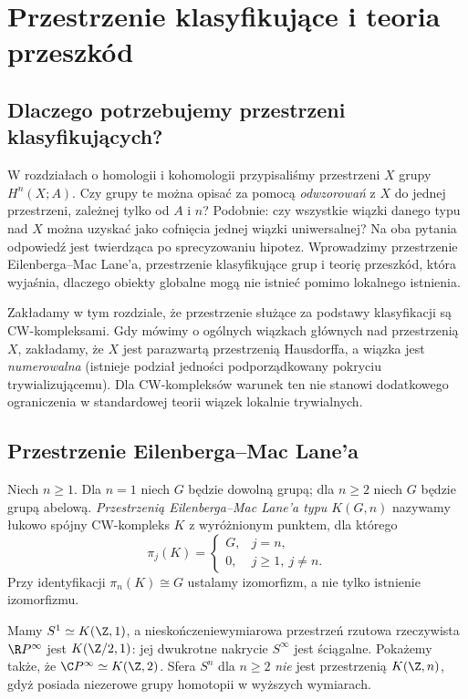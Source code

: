 \chapter{Przestrzenie klasyfikujące i teoria przeszkód}
\label{ch:klasyfikacja-v6}

\providecommand{\atlasref}[2]{#2}


\section{Dlaczego potrzebujemy przestrzeni klasyfikujących?}
W rozdziałach o homologii i kohomologii przypisaliśmy przestrzeni $X$
grupy $H^n(X;A)$. Czy grupy te można opisać za pomocą
\emph{odwzorowań} z $X$ do jednej przestrzeni, zależnej tylko od
$A$ i $n$? Podobnie: czy wszystkie wiązki danego typu nad $X$
można uzyskać jako cofnięcia jednej wiązki uniwersalnej?
Na oba pytania odpowiedź jest twierdząca po sprecyzowaniu
hipotez. Wprowadzimy przestrzenie Eilenberga--Mac Lane'a,
przestrzenie klasyfikujące grup i teorię przeszkód, która
wyjaśnia, dlaczego obiekty globalne mogą nie istnieć
pomimo lokalnego istnienia.

Zakładamy w tym rozdziale, że przestrzenie służące za
podstawy klasyfikacji są CW-kompleksami. Gdy mówimy
o ogólnych wiązkach głównych nad przestrzenią $X$,
zakładamy, że $X$ jest parazwartą przestrzenią Hausdorffa, a wiązka jest
\emph{numerowalna} (istnieje podział jedności podporządkowany
pokryciu trywializującemu). Dla CW-kompleksów
warunek ten nie stanowi dodatkowego ograniczenia
w standardowej teorii wiązek lokalnie trywialnych.

\section{Przestrzenie Eilenberga--Mac Lane'a}
\begin{definicja}
Niech $n\ge1$. Dla $n=1$ niech $G$ będzie dowolną grupą;
dla $n\ge2$ niech $G$ będzie grupą abelową.
\emph{Przestrzenią Eilenberga--Mac Lane'a typu $K(G,n)$}
nazywamy łukowo spójny CW-kompleks $K$ z wyróżnionym
punktem, dla którego
\[
\pi_j(K)=\begin{cases}G,&j=n,\\0,&j\ge1,\ j\ne n.
\end{cases}
\]
Przy identyfikacji $\pi_n(K)\cong G$ ustalamy
izomorfizm, a nie tylko istnienie izomorfizmu.
\end{definicja}
\begin{przyklad}
Mamy $S^1\simeq K(\Z,1)$, a nieskończeniewymiarowa
przestrzeń rzutowa rzeczywista $\R P^\infty$ jest
$K(\Z/2,1)$: jej dwukrotne nakrycie $S^\infty$
jest ściągalne. Pokażemy także, że
$\C P^\infty\simeq K(\Z,2)$.
Sfera $S^n$ dla $n\ge2$ \emph{nie} jest przestrzenią
$K(\Z,n)$, gdyż posiada niezerowe grupy homotopii
w wyższych wymiarach.
\end{przyklad}

